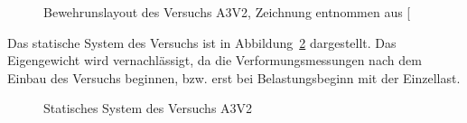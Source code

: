 \documentclass[
  10pt,
  letterpaper,
]{scrreprt}
\begin{document}
\begin{figure}[H]


\caption{\label{fig-bewehrung_a3v2}Bewehrunslayout des Versuchs A3V2,
Zeichnung entnommen aus {[}\citeproc{ref-jager_versuche_2006}{2}{]}}

\end{figure}%

Das statische System des Versuchs ist in Abbildung~\ref{fig-system_a3v2}
dargestellt. Das Eigengewicht wird vernachlässigt, da die
Verformungsmessungen nach dem Einbau des Versuchs beginnen, bzw. erst
bei Belastungsbeginn mit der Einzellast.

\begin{figure}[H]


\caption{\label{fig-system_a3v2}Statisches System des Versuchs A3V2}

\end{figure}%
\end{document}
